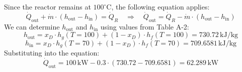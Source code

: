 Since the reactor remains at \( 100^\circ\text{C} \), the following equation applies:  
\[
\dot{Q}_{\text{out}} + \dot{m} \cdot (h_{\text{out}} - h_{\text{in}}) = \dot{Q}_R \quad \Rightarrow \quad \dot{Q}_{\text{out}} = \dot{Q}_R - \dot{m} \cdot (h_{\text{out}} - h_{\text{in}})
\]  
We can determine \( h_{\text{out}} \) and \( h_{\text{in}} \) using values from Table A-2:  
\[
h_{\text{out}} = x_D \cdot h_g(T=100) + (1 - x_D) \cdot h_f(T=100) = 730.72 \, \text{kJ/kg}
\]  
\[
h_{\text{in}} = x_D \cdot h_g(T=70) + (1 - x_D) \cdot h_f(T=70) = 709.6581 \, \text{kJ/kg}
\]  
Substituting into the equation:  
\[
\dot{Q}_{\text{out}} = 100 \, \text{kW} - 0.3 \cdot (730.72 - 709.6581) = 62.289 \, \text{kW}
\]